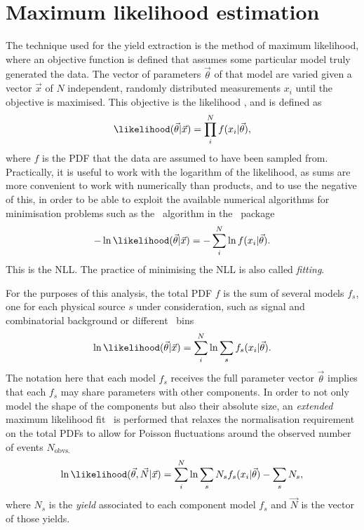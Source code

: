 \chapter{Maximum likelihood estimation}
\label{chap:mle}

The technique used for the yield extraction is the method of maximum 
likelihood, where an objective function is defined that assumes some particular 
model truly generated the data.
The vector of parameters $\vec{\theta}$ of that model are varied given a vector 
$\vec{x}$ of $N$ independent, randomly distributed measurements $x_{i}$ until 
the objective is maximised.
This objective is the likelihood \likelihood, and is defined as
\begin{equation}
  \likelihood(\vec{\theta}|\vec{x}) = \prod_{i}^{N} f(x_{i}|\vec{\theta}),
\end{equation}
where $f$ is the \ac{PDF} that the data are assumed to have been sampled 
from.\footnotemark
Practically, it is useful to work with the logarithm of the likelihood, as sums 
are more convenient to work with numerically than products, and to use the 
negative of this, in order to be able to exploit the available numerical 
algorithms for minimisation problems such as the \migrad\ algorithm in the 
\minuit\ package~\cite{James:1975dr,James:1994vla}
\begin{equation}
  -\ln{\likelihood(\vec{\theta}|\vec{x})} =
  -\sum_{i}^{N} \ln{f(x_{i}|\vec{\theta})}.
\end{equation}
This is the \acf{NLL}.
The practice of minimising the \ac{NLL} is also called \emph{fitting}.


For the purposes of this analysis, the total \ac{PDF} $f$ is the sum of several 
models $f_{s}$, one for each physical source $s$ under consideration, such as 
signal and combinatorial background or different \pTy\ bins
\begin{equation}
  \ln{\likelihood(\vec{\theta}|\vec{x})} =
  \sum_{i}^{N} \ln{\sum_{s} f_{s}(x_{i}|\vec{\theta})}.
\end{equation}
The notation here that each model $f_{s}$ receives the full parameter vector 
$\vec{\theta}$ implies that each $f_{s}$ may share parameters with other 
components.
In order to not only model the shape of the components but also their absolute 
size, an \emph{extended} maximum likelihood fit~\cite{Barlow:1990vc} is 
performed that relaxes the normalisation requirement on the total \acp{PDF} to 
allow for Poisson fluctuations around the observed number of events 
$N_{\text{obvs.}}$
\begin{equation}
  \ln{\likelihood(\vec{\theta}, \vec{N}|\vec{x})} =
  \sum_{i}^{N}
    \ln{\sum_{s} N_{s}f_{s}(x_{i}|\vec{\theta})}
    - \sum_{s} N_{s}
  ,
\end{equation}
where $N_{s}$ is the \emph{yield} associated to each component model $f_{s}$ 
and $\vec{N}$ is the vector of those yields.


